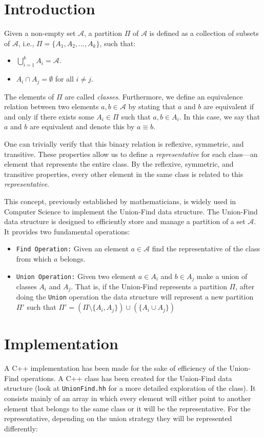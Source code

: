 \section{Introduction}
Given a non-empty set $\mathcal{A}$, a partition $\Pi$ of $\mathcal{A}$ is defined as a collection of subsets of $\mathcal{A}$, i.e., $\Pi = \{A_1, A_2, \ldots, A_k\}$, such that:

\begin{itemize}
    \item $\bigcup\limits_{i = 1}^{k} A_i = \mathcal{A}$.
    \item $A_i \cap A_j = \emptyset$ for all $i \neq j$.
\end{itemize}

The elements of $\Pi$ are called \textit{classes}. Furthermore, we define an equivalence relation between two elements $a, b \in \mathcal{A}$ by stating that $a$ and $b$ are equivalent if and only if there exists some $A_i \in \Pi$ such that $a, b \in A_i$. In this case, we say that $a$ and $b$ are equivalent and denote this by $a \equiv b$.

One can trivially verify that this binary relation is reflexive, symmetric, and transitive. These properties allow us to define a \textit{representative} for each class—an element that represents the entire class. By the reflexive, symmetric, and transitive properties, every other element in the same class is related to this \textit{representative}.

This concept, previously established by mathematicians, is widely used in Computer Science to implement the Union-Find data structure. The Union-Find data structure is designed to efficiently store and manage a partition of a set $\mathcal{A}$. It provides two fundamental operations:

\begin{itemize}
    \item \texttt{Find Operation:} Given an element $a \in \mathcal{A}$ find the representative of the class from which $a$ belongs.
    \item \texttt{Union Operation:} Given two element $a \in A_i$ and $b \in A_j$ make a union of classes $A_i$ and $A_j$. That is, if the Union-Find represents a partition $\Pi$, after doing the \texttt{Union} operation the data structure will represent a new partition $\Pi'$ such that $\Pi' =  (\Pi \setminus \{A_i,A_j\}) \cup (\{A_i \cup A_j\})$
\end{itemize}

\section{Implementation}
A C++ implementation has been made for the sake of efficiency of the Union-Find operations. A C++ class has been created for the Union-Find data structure (look at \texttt{UnionFind.hh} for a more detailed exploration of the class). It consists mainly of an array in which every element will either point to another element that belongs to the same class or it will be the representative. For the representative, depending on the union strategy they will be represented differently:

